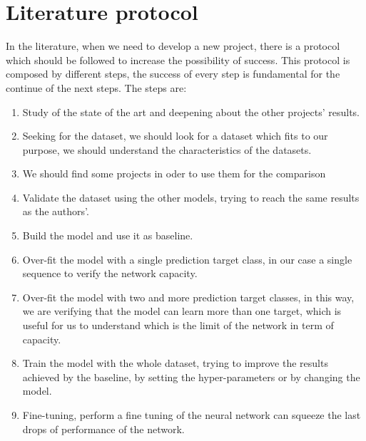 \section{Literature protocol}\label{sec:literature-protocol}

In the literature, when we need to develop a new project, there is a protocol which should be followed to increase the possibility of success.
This protocol is composed by different steps, the success of every step is fundamental for the continue of the next steps.
The steps are:
\begin{enumerate}
    \item Study of the state of the art and deepening about the other projects' results.
    \item Seeking for the dataset, we should look for a dataset which fits to our purpose, we should understand the characteristics of the datasets.
    \item We should find some projects in oder to use them for the comparison
    \item Validate the dataset using the other models, trying to reach the same results as the authors'.
    \item Build the model and use it as baseline.
    \item Over-fit the model with a single prediction target class, in our case a single sequence to verify the network capacity.
    \item Over-fit the model with two and more prediction target classes, in this way, we are verifying that the model can learn more than one target, which is useful for us to understand which is the limit of the network in term of capacity.
    \item Train the model with the whole dataset, trying to improve the results achieved by the baseline, by setting the hyper-parameters or by changing the model.
    \item Fine-tuning, perform a fine tuning of the neural network can squeeze the last drops of performance of the network.
\end{enumerate}